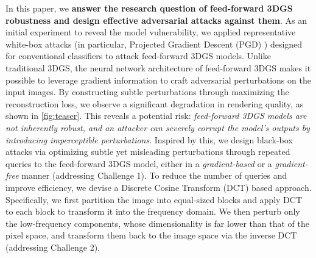 \documentclass[runningheads]{llncs}
\begin{document}
In this paper, we \textbf{answer the research question of feed-forward 3DGS robustness and design effective adversarial attacks against them}. 
As an initial experiment to reveal the model vulnerability, we applied representative white-box attacks (in particular, Projected Gradient Descent (PGD) \cite{madry2017towards}) designed for conventional classifiers to attack feed-forward 3DGS models. Unlike traditional 3DGS, the neural network architecture of feed-forward 3DGS makes it possible to leverage gradient information to craft adversarial perturbations on the input images. By constructing subtle perturbations through maximizing the reconstruction loss, we observe a significant degradation in rendering quality, as shown in \cref{fig:teaser}. This reveals a potential risk:\textit{ feed-forward 3DGS models are not inherently robust, and an attacker can severely corrupt the model’s outputs by introducing imperceptible perturbations}. 
Inspired by this, we design black-box attacks via optimizing subtle yet misleading perturbations through repeated queries to the feed-forward 3DGS model, either in a  \textit{gradient-based} or a \textit{gradient-free} manner (addressing Challenge 1). To reduce the number of queries and improve efficiency, we devise a Discrete Cosine Transform (DCT) based approach. Specifically, we first partition the image into equal-sized blocks and apply DCT to each block to transform it into the frequency domain. We then perturb only the low-frequency components, whose dimensionality is far lower than that of the pixel space, and transform them back to the image space via the inverse DCT (addressing Challenge 2). 
\end{document}
